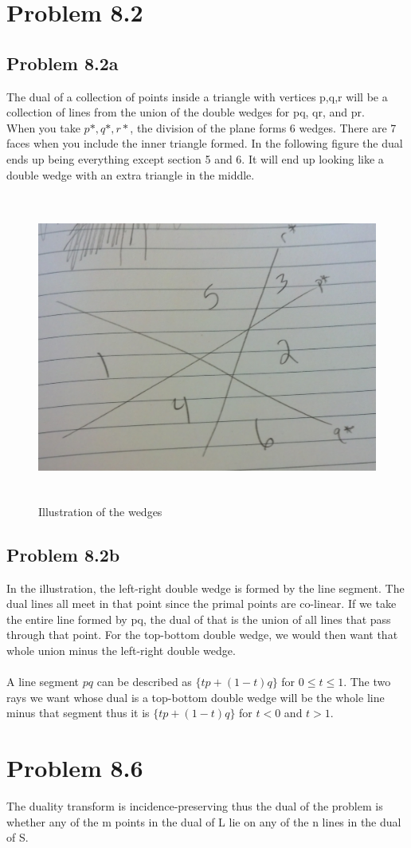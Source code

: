 \documentclass[11pt,psfig]{article}
\begin{document}
\section*{Problem 8.2}

\subsection*{Problem 8.2a}

The dual of a collection of points inside a triangle with vertices p,q,r will be a collection of lines from the union of the double wedges for pq, qr, and pr. 
\\
When you take $p*, q*, r*$, the division of the plane forms 6 wedges. There are 7 faces when you include the inner triangle formed. In the following figure the dual ends up being everything except section 5 and 6. It will end up looking like a double wedge with an extra triangle in the middle. 

\begin{figure}[H]
\centering
\includegraphics[height=4in]{cs266dual.jpg}
\caption{Illustration of the wedges}
\end{figure}

\newpage

\subsection*{Problem 8.2b}

In the illustration, the left-right double wedge is formed by the line segment. The dual lines all meet in that point since the primal points are co-linear. If we take the entire line formed by pq, the dual of that is the union of all lines that pass through that point. For the top-bottom double wedge, we would then want that whole union minus the left-right double wedge. \\
\\
A line segment $pq$ can be described as $\{tp + (1-t)q\}$ for $0 \leq t \leq 1$. The two rays we want whose dual is a top-bottom double wedge will be the whole line minus that segment thus it is $\{tp + (1-t)q\}$ for $t < 0$ and $t > 1$. 

\section*{Problem 8.6}

The duality transform is incidence-preserving thus the dual of the problem is whether any of the m points in the dual of L lie on any of the n lines in the dual of S. 
\end{document}
